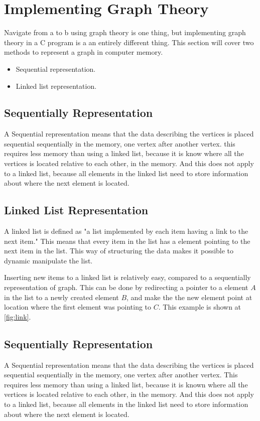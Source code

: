 \section{Implementing Graph Theory}

Navigate from a to b using graph theory is one thing, but implementing graph theory in a C program is a an entirely different thing. This section will cover two methods to represent a graph in computer memory. 

\begin{itemize}
	\item Sequential representation.
	\item Linked list representation.
\end{itemize} 

\subsection{Sequentially Representation}
A Sequential representation means that the data describing the vertices is placed sequential sequentially in the memory, one vertex after another vertex. 
this requires less memory than using a linked list, because it is know where all the vertices is located relative to each other, in the memory. And this does not apply to a linked list, because all elements in the linked list need to store information about where the next element is located.


\subsection{Linked List Representation}
A linked list is defined as "a list implemented by each item having a link to the next item."\cite{linked_list_def}
This means that every item in the list has a element pointing to the next item in the list. This way of structuring the data makes it possible to dynamic manipulate the list.\cite{Linked_List}

Inserting new items to a linked list is relatively easy, compared to a sequentially representation of graph. 
This can be done by redirecting a pointer to a element $A$ in the list to a newly created element $B$, and make the the new element point at location where the first element was pointing to $C$. This example is shown at \cref{fig:link}.

\subsection{Sequentially Representation}
A Sequential representation means that the data describing the vertices is placed sequential sequentially in the memory, one vertex after another vertex. 
This requires less memory than using a linked list, because it is known where all the vertices is located relative to each other, in the memory. And this does not apply to a linked list, because all elements in the linked list need to store information about where the next element is located.


